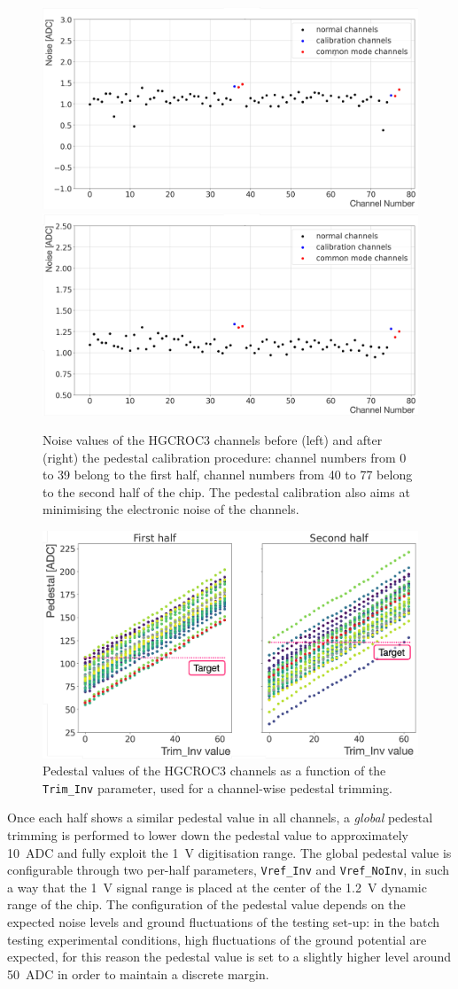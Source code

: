 \begin{figure}
    \centering
    \includegraphics[width=0.49\linewidth]{Figures/HGCAL/Noise_0.pdf}
    \includegraphics[width=0.49\linewidth]{Figures/HGCAL/Noise_1.pdf}
    \caption{Noise values of the HGCROC3 channels before (left) and after (right) the pedestal calibration procedure: channel numbers from 0 to 39 belong to the first half, channel numbers from 40 to 77 belong to the second half of the chip. The pedestal calibration also aims at minimising the electronic noise of the channels.}
    \label{fig:Noise}
\end{figure}

\begin{figure} 
    \centering
    \includegraphics[width=0.7\linewidth]{Figures/HGCAL/PedestalScan.pdf}
    \caption{Pedestal values of the HGCROC3 channels as a function of the \texttt{Trim\_Inv} parameter, used for a channel-wise pedestal trimming.}
    \label{fig:PedestalScan}
\end{figure}

\bigbreak

Once each half shows a similar pedestal value in all channels, a \textit{global} pedestal trimming is performed to lower down the pedestal value to approximately 10~ADC and fully exploit the 1~V digitisation range.
The global pedestal value is configurable through two per-half parameters, \texttt{Vref\_Inv} and \texttt{Vref\_NoInv}, in such a way that the 1~V signal range is placed at the center of the 1.2~V dynamic range of the chip.
The configuration of the pedestal value depends on the expected noise levels and ground fluctuations of the testing set-up: in the batch testing experimental conditions, high fluctuations of the ground potential are expected, for this reason the pedestal value is set to a slightly higher level around 50~ADC in order to maintain a discrete margin.

